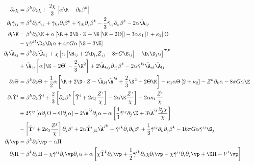 \begin{align} \partial_t \chi &=  \beta^k \partial_k \chi + \frac{2\chi}{3} \left[\alpha \K - \partial_k \beta^k \right]\\
\partial_t\tilde{\gamma}_{ij} &=  \beta^k\partial_k\tilde{\gamma}_{ij}  + \tilde{\gamma}_{kj}\partial_i \beta^k + \tilde{\gamma}_{ik}\partial_j\beta^k - \frac{2}{3}\tilde{\gamma}_{ij} \partial_k \beta^k - 2\alpha\tilde{\A}_{ij}\\
\partial_t\K &=  \beta^k\partial_k\K + \alpha\left[ \R + 2\D\cdot Z + \K\left[ \K-2\Theta\right]\right] - 3\alpha \kappa_1\left[ 1+\kappa_2\right]\Theta\\
&-\chi\tilde{\gamma}^{kl}\D_k\D_l\alpha + 4\pi G\alpha\left[ \S - 3\E\right]\nonumber \\
\partial_t\tilde{\A}_{ij} &=  \beta^k \partial_k \tilde{\A}_{ij}+\chi\left[\alpha\left[\R_{ij} + 2\D_{(i}Z_{j)}-8\pi G \S_{ij} \right] -\D_i\D_j\alpha \right]^{TF}\\
& +\tilde{\A}_{ij}\left[ \alpha\left[ \K-2\Theta\right]-\frac{2}{3}\K^2\right] + 2\tilde{\A}_{k(i}\partial_{j)}\beta^k -2\alpha\tilde{\gamma}^{kl}\tilde{\A}_{ik}\tilde{\A}_{lj}\nonumber\\
\partial_t\Theta &= \beta^k\partial_k \Theta + \frac{1}{2}\alpha\left[ \R + 2\D\cdot Z - \tilde{\A}_{kl} \tilde{\A}^{kl} + \frac{2}{3}\K^2 - 2\Theta\K\right] -\kappa_1\alpha\Theta\left[ 2+\kappa_2\right] - Z^k\partial_k\alpha - 8\pi G \alpha \E \\
\partial_t\hat{\Upsilon}^i &=  \beta^k \partial_k \hat{\Upsilon}^i + \frac{2}{3}\left[ \partial_k \beta^k \left[ \tilde{\Upsilon}^i+2\kappa_3 \frac{Z^{i}}{\chi}\right]-2\alpha\K\frac{Z^j}{\chi}\right]-2\alpha\kappa_1\frac{Z^i}{\chi}\\
& + 2\tilde{\gamma}^{ij}\left[ \alpha\partial_j\Theta -\Theta \partial_j\alpha \right] -2\tilde{\A}^{ij}\partial_j\alpha - \alpha\left[ \frac{4}{3}\tilde{\gamma}^{ij}\partial_j\K + 3\tilde{\A}^{ij}\frac{\partial_j \chi}{\chi}\right]\nonumber\\
& -\left[ \tilde{\Upsilon}^j + 2\kappa_3 \frac{Z^j}{\chi}\right]\partial_j \beta^i + 2\alpha \tilde{\Upsilon}^i_{\,\,\,jk}\tilde{\A}^{jk} + \tilde{\gamma}^{jk}\partial_j\partial_k \beta^i + \frac{1}{3} \tilde{\gamma}^{ij}\partial_k \partial_j \beta^k - 16\pi G \alpha \tilde{\gamma}^{ij}\S_j\nonumber\\
\partial_t \vp &= \beta^k\partial_k \vp - \alpha\Pi\\
\partial_t \Pi &= \beta^k\partial_k\Pi -\chi \tilde{\gamma}^{ij}\partial_i \vp \partial_j \alpha + \alpha \left[ \chi \tilde{\Upsilon}^k\partial_k \vp+\frac{1}{2} \tilde{\gamma}^{lk}\partial_k\chi\partial_l\vp  - \chi \tilde{\gamma}^{ij}\partial_i \partial_j \vp + \K \Pi + V' \vp \right]\end{align}
